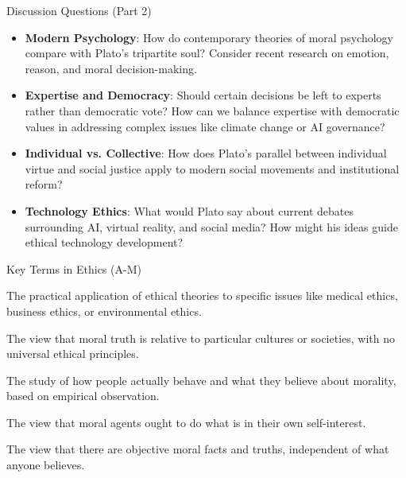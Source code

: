 \documentclass[aspectratio=169]{beamer}
\begin{document}
\begin{frame}{Discussion Questions (Part 2)}
\begin{itemize}
\item \textbf{Modern Psychology}: How do contemporary theories of moral psychology compare with Plato's tripartite soul? Consider recent research on emotion, reason, and moral decision-making.

\item \textbf{Expertise and Democracy}: Should certain decisions be left to experts rather than democratic vote? How can we balance expertise with democratic values in addressing complex issues like climate change or AI governance?

\item \textbf{Individual vs. Collective}: How does Plato's parallel between individual virtue and social justice apply to modern social movements and institutional reform?

\item \textbf{Technology Ethics}: What would Plato say about current debates surrounding AI, virtual reality, and social media? How might his ideas guide ethical technology development?
\end{itemize}
\end{frame}

\begin{frame}{Key Terms in Ethics (A-M)}
\begin{description}[leftmargin=!,labelwidth=\widthof{\bfseries Moral Realism}]
\item[\textbf{Applied Ethics}] The practical application of ethical theories to specific issues like medical ethics, business ethics, or environmental ethics.

\item[\textbf{Cultural Relativism}] The view that moral truth is relative to particular cultures or societies, with no universal ethical principles.

\item[\textbf{Descriptive Ethics}] The study of how people actually behave and what they believe about morality, based on empirical observation.

\item[\textbf{Ethical Egoism}] The view that moral agents ought to do what is in their own self-interest.

\item[\textbf{Moral Realism}] The view that there are objective moral facts and truths, independent of what anyone believes.
\end{description}
\end{frame}
\end{document}
